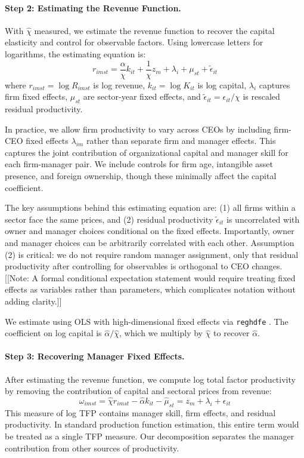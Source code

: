 \documentclass[11pt,a4paper]{article}
\begin{document}
\paragraph{Step 2: Estimating the Revenue Function.} With $\hat{\chi}$ measured, we estimate the revenue function to recover the capital elasticity and control for observable factors. Using lowercase letters for logarithms, the estimating equation is:
\begin{equation}
r_{imst} = \frac{\alpha}{\chi} k_{it} + \frac{1}{\chi}z_m + \lambda_i + \mu_{st} + \tilde{\epsilon}_{it}
\end{equation}
where $r_{imst} = \log R_{imst}$ is log revenue, $k_{it} = \log K_{it}$ is log capital, $\lambda_i$ captures firm fixed effects, $\mu_{st}$ are sector-year fixed effects, and $\tilde{\epsilon}_{it} = \epsilon_{it}/\chi$ is rescaled residual productivity.

In practice, we allow firm productivity to vary across CEOs by including firm-CEO fixed effects $\lambda_{im}$ rather than separate firm and manager effects. This captures the joint contribution of organizational capital and manager skill for each firm-manager pair. We include controls for firm age, intangible asset presence, and foreign ownership, though these minimally affect the capital coefficient.

The key assumptions behind this estimating equation are: (1) all firms within a sector face the same prices, and (2) residual productivity $\tilde{\epsilon}_{it}$ is uncorrelated with owner and manager choices conditional on the fixed effects. Importantly, owner and manager choices can be arbitrarily correlated with each other. Assumption (2) is critical: we do not require random manager assignment, only that residual productivity after controlling for observables is orthogonal to CEO changes. [[Note: A formal conditional expectation statement would require treating fixed effects as variables rather than parameters, which complicates notation without adding clarity.]]

We estimate using OLS with high-dimensional fixed effects via \texttt{reghdfe} \citep{reghdfe}. The coefficient on log capital is $\hat{\alpha}/\hat{\chi}$, which we multiply by $\hat{\chi}$ to recover $\hat{\alpha}$.

\paragraph{Step 3: Recovering Manager Fixed Effects.} After estimating the revenue function, we compute log total factor productivity by removing the contribution of capital and sectoral prices from revenue:
\begin{equation}
\omega_{imst} = \hat{\chi} r_{imst} - \hat{\alpha} k_{it} - \hat{\mu}_{st} = z_m + \lambda_i + \epsilon_{it}
\end{equation}
This measure of log TFP contains manager skill, firm effects, and residual productivity. In standard production function estimation, this entire term would be treated as a single TFP measure. Our decomposition separates the manager contribution from other sources of productivity.
\end{document}
